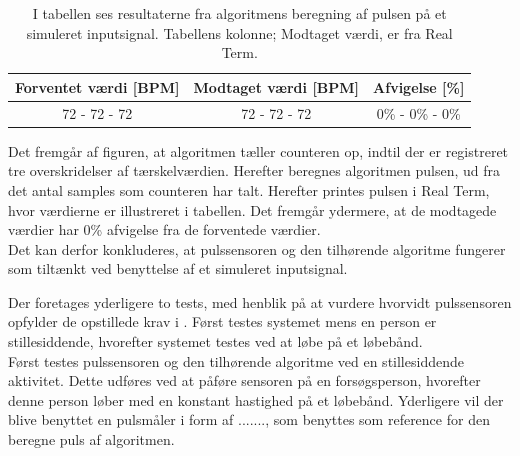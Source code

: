 \begin{table}[H]
	\centering
	\begin{tabular}{ccc}
		\hline
		\rowcolor[HTML]{C0C0C0} 
		Forventet værdi [BPM] & Modtaget værdi [BPM] & Afvigelse [\%]\\ \hline
		72 - 72 - 72          & 72 - 72 - 72         & 0\% - 0\% - 0\% \\ \hline
	\end{tabular}
	\caption{I tabellen ses resultaterne fra algoritmens beregning af pulsen på et simuleret inputsignal. Tabellens kolonne; Modtaget værdi, er fra Real Term.}
	\label{tab:test_puls_realterm}
\end{table} \vspace{-0.5cm}

Det fremgår af figuren, at algoritmen tæller counteren op, indtil der er registreret tre overskridelser af tærskelværdien. Herefter beregnes algoritmen pulsen, ud fra det antal samples som counteren har talt. Herefter printes pulsen i Real Term, hvor værdierne er illustreret i tabellen. Det fremgår ydermere, at de modtagede værdier har 0\% afvigelse fra de forventede værdier. \\
Det kan derfor konkluderes, at pulssensoren og den tilhørende algoritme fungerer som tiltænkt ved benyttelse af et simuleret inputsignal. 

Der foretages yderligere to tests, med henblik på at vurdere hvorvidt pulssensoren opfylder de opstillede krav i . Først testes systemet mens en person er stillesiddende, hvorefter systemet testes ved at løbe på et løbebånd. \\
Først testes pulssensoren og den tilhørende algoritme ved en stillesiddende aktivitet. Dette udføres ved at påføre sensoren på en forsøgsperson, hvorefter denne person løber med en konstant hastighed på et løbebånd. Yderligere vil der blive benyttet en pulsmåler i form af ......., som benyttes som reference for den beregne puls af algoritmen. 








